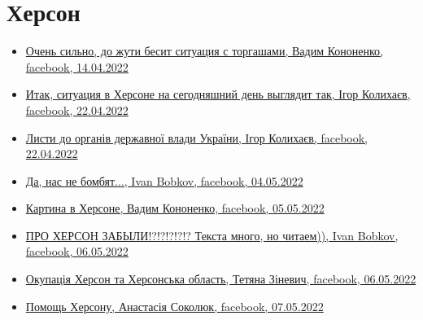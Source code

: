  
 
 
 
 

\section{Херсон}
\label{sec:topics.vojna.cities.herson}

\begin{itemize} %

\item \hyperlink{14_04_2022.fb.kononenko_vadim.herson.1.torgashi}{%
Очень сильно, до жути бесит ситуация с торгашами, Вадим Кононенко, facebook, 14.04.2022%
}

\item \hyperlink{22_04_2022.fb.kolyhaev_igor.herson.mer.1.herson}{%
Итак, ситуация в Херсоне на сегодняшний день выглядит так, Ігор Колихаєв, facebook, 22.04.2022%
}

\item \hyperlink{26_04_2022.fb.kolyhaev_igor.herson.mer.1.lysty}{%
Листи до органів державної влади України, Ігор Колихаєв, facebook, 22.04.2022%
}

\item \hyperlink{04_05_2022.fb.bobkov_ivan.1.nas_ne_bombjat}{%
Да, нас не бомбят..., Ivan Bobkov, facebook, 04.05.2022%
}

\item \hyperlink{05_05_2022.fb.kononenko_vadim.herson.1.kartina_v_hersone}{%
Картина в Херсоне, Вадим Кононенко, facebook, 05.05.2022%
}

\item \hyperlink{06_05_2022.fb.bobkov_ivan.1.pro_herson_zabyli}{%
ПРО ХЕРСОН ЗАБЫЛИ!?!?!?!?!?  Текста много, но читаем)), Ivan Bobkov, facebook, 06.05.2022%
}

\item \hyperlink{06_05_2022.fb.zinevich_tetjana.herson.1.okupacia}{%
Окупація Херсон та Херсонська область, Тетяна Зіневич, facebook, 06.05.2022%
}

\item \hyperlink{07_05_2022.fb.sokoljuk_anastasia.1.pomosch_hersonu}{%
Помощь Херсону, Анастасія Соколюк, facebook, 07.05.2022%
}

\end{itemize} %
